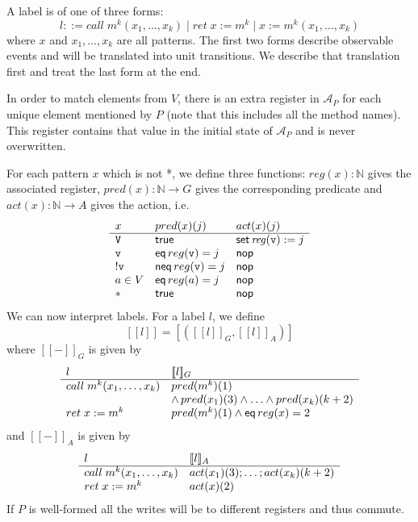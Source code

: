 \documentclass[9pt, preprint]{sigplanconf} %
\newcommand{\N}{\ensuremath{\mathbb{N}}}
\newcommand{\A}{\ensuremath{\mathcal{A}}}
\theoremstyle{definition}
\theoremstyle{remark}
\begin{document}
A label is of one of three forms:
\[
  l ::=
  call\;m^k(x_1, \ldots, x_k) \mid
  ret\;x := m^k \mid
  x := m^k(x_1, \ldots, x_k)
\]
where $x$ and $x_1, \ldots, x_k$ are all patterns.
The first two forms describe observable events and will be translated
into unit transitions. We describe that translation first and treat
the last form at the end.

In order to match elements from $V$, there is an extra register in
$\A_P$ for each unique element mentioned by $P$ (note that this
includes all the method names). This register contains
that value in the initial state of $\A_P$ and is never overwritten.

For each pattern $x$ which is not *, we define three functions:
$reg(x) : \N$ gives the associated register, $pred(x) : \N\to G$ gives
the corresponding predicate and $act(x) : \N\to A$ gives the action, i.e.
\[
\begin{array}{l l l}
  x & pred(x)(j) & act(x)(j) \\
  \hline
  \mathtt{V} & {\sf true} & {\sf set}\,{\it reg}({\tt v}):=j \\
  \mathtt{v} & {\sf eq}\,reg(\mathtt{v})=j & {\sf nop} \\
  \mathtt{!v} & {\sf neq}\,reg(\mathtt{v})=j  & {\sf nop}  \\
  a\in V & {\sf eq}\,reg(a)=j  & {\sf nop}  \\
  * & {\sf true} & {\sf nop}  \\
\end{array}
\]
We can now interpret labels.
\newcommand{\den}[1]{[\![#1]\!]}
\newcommand{\denG}[1]{\den{#1}_G}
\newcommand{\denA}[1]{\den{#1}_A}
For a label $l$, we define
\[
\den{l} = [(\denG{l}, \denA{l})]
\]
where $\denG-$ is given by
\[
\begin{array}{l l}
  l & \denG l \\
  \hline
  call\;m^k(x_1, \ldots, x_k) & pred(m^k)(1) \\
                                           & \land\,pred(x_1)(3) \land\ldots\land pred(x_k)(k+2) \\
  ret\;x := m^k & pred(m^k)(1) \land {\sf eq}\,reg(x) = 2 \\
\end{array}
\]
and $\denA-$ is given by
\[
\begin{array}{l l l}
  l & \denA l \\
  \hline
  call\;m^k(x_1, \ldots, x_k) & act(x_1)(3); \dots; act(x_k)(k+2) \\
  ret\;x := m^k & act(x)(2) \\
\end{array}
\]
If $P$ is well-formed all the writes will be to different registers
and thus commute.
\end{document}
